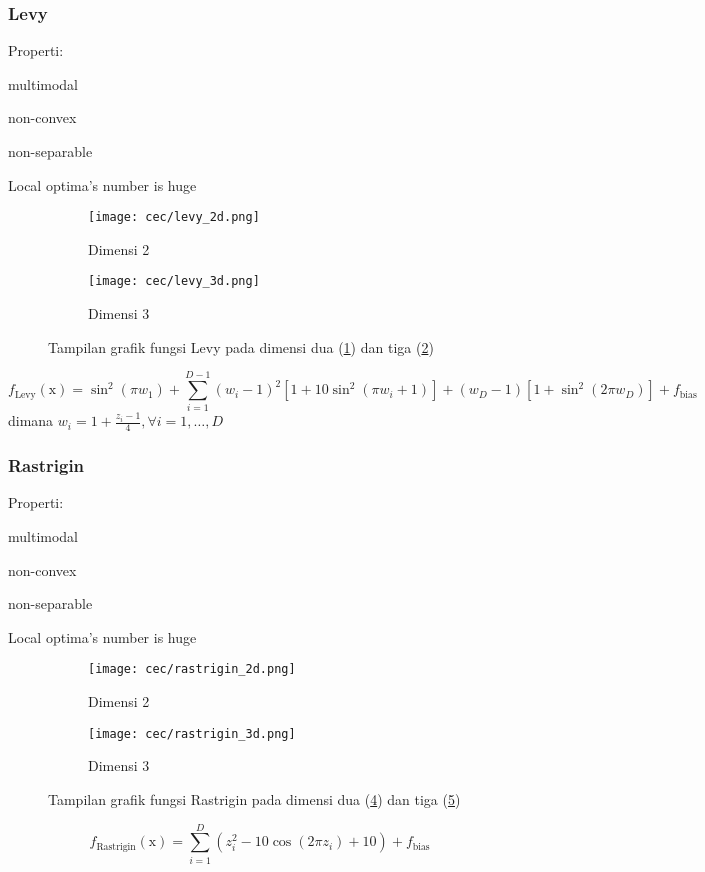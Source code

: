 \subsubsection*{Levy}
\noindent Properti:
\begin{packed_item}
  \item multimodal
  \item non-convex
  \item non-separable
  \item Local optima's number is huge
\end{packed_item}
\begin{figure}[H]
	\centering
	\begin{subfigure}[b]{0.4\textwidth}
		\centering
		\texttt{[image: cec/levy\_2d.png]}
		\caption{Dimensi 2}
		\label{fig:levy-2d}
	\end{subfigure}
	\hfill
	\begin{subfigure}[b]{0.4\textwidth}
		\centering
		\texttt{[image: cec/levy\_3d.png]}
		\caption{Dimensi 3}
		\label{fig:levy-3d}
	\end{subfigure}
	\caption{Tampilan grafik fungsi Levy pada dimensi dua (\cref{fig:levy-2d}) dan tiga (\cref{fig:levy-3d})}
	\label{fig:levy}
\end{figure}
\begin{equation}
  f_{\text{Levy}}(\mathrm{x})=\sin^2\left(\pi w_1 \right)+\sum_{i=1}^{D-1}\left(w_i-1 \right)^2\left[1+10\sin^2\left( \pi w_i+1\right)\right]+\left(w_D-1 \right)\left[1+\sin^2\left( 2\pi w_D\right)  \right]+f_{\text{bias}}
\end{equation}
dimana $w_i=1+\frac{z_i-1}{4},\forall i=1,\ldots,D$

\subsubsection*{Rastrigin}
\noindent Properti:
\begin{packed_item}
  \item multimodal
  \item non-convex
  \item non-separable
  \item Local optima's number is huge
\end{packed_item}
\begin{figure}[H]
	\centering
	\begin{subfigure}[b]{0.4\textwidth}
		\centering
		\texttt{[image: cec/rastrigin\_2d.png]}
		\caption{Dimensi 2}
		\label{fig:rastrigin-2d}
	\end{subfigure}
	\hfill
	\begin{subfigure}[b]{0.4\textwidth}
		\centering
		\texttt{[image: cec/rastrigin\_3d.png]}
		\caption{Dimensi 3}
		\label{fig:rastrigin-3d}
	\end{subfigure}
	\caption{Tampilan grafik fungsi Rastrigin pada dimensi dua (\cref{fig:rastrigin-2d}) dan tiga (\cref{fig:rastrigin-3d})}
	\label{fig:rastrigin}
\end{figure}
\begin{equation}
  f_{\text{Rastrigin}}(\mathrm{x})=\sum_{i=1}^{D}\left(z_i^2-10\cos\left(2\pi z_i \right)+10\right) +f_{\text{bias}}
\end{equation}

